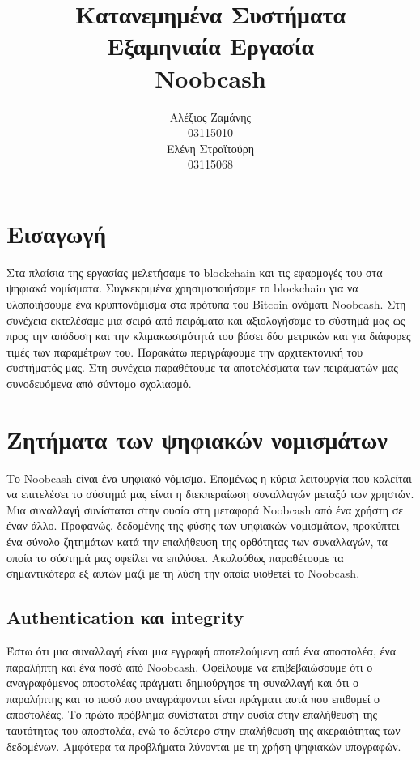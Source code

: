 \documentclass[titlepage]{article}
\begin{document}
\title{Κατανεμημένα Συστήματα\\
    Εξαμηνιαία Εργασία\\
    Noobcash}
\author{Αλέξιος Ζαμάνης\\
    03115010\\
    Ελένη Στραϊτούρη\\
    03115068}

\maketitle

\tableofcontents

\section{Εισαγωγή}

Στα πλαίσια της εργασίας μελετήσαμε το blockchain και τις εφαρμογές του στα ψηφιακά νομίσματα. Συγκεκριμένα χρησιμοποιήσαμε το blockchain για να υλοποιήσουμε ένα κρυπτονόμισμα στα πρότυπα του Bitcoin ονόματι Noobcash. Στη συνέχεια εκτελέσαμε μια σειρά από πειράματα και αξιολογήσαμε το σύστημά μας ως προς την απόδοση και την κλιμακωσιμότητά του βάσει δύο μετρικών και για διάφορες τιμές των παραμέτρων του. Παρακάτω περιγράφουμε την αρχιτεκτονική του συστήματός μας. Στη συνέχεια παραθέτουμε τα αποτελέσματα των πειράματών μας συνοδευόμενα από σύντομο σχολιασμό.

\section{Ζητήματα των ψηφιακών νομισμάτων}

Το Noobcash είναι ένα ψηφιακό νόμισμα. Επομένως η κύρια λειτουργία που καλείται να επιτελέσει το σύστημά μας είναι η διεκπεραίωση συναλλαγών μεταξύ των χρηστών. Μια συναλλαγή συνίσταται στην ουσία στη μεταφορά Noobcash από ένα χρήστη σε έναν άλλο. Προφανώς, δεδομένης της φύσης των ψηφιακών νομισμάτων, προκύπτει ένα σύνολο ζητημάτων κατά την επαλήθευση της ορθότητας των συναλλαγών, τα οποία το σύστημά μας οφείλει να επιλύσει. Ακολούθως παραθέτουμε τα σημαντικότερα εξ αυτών μαζί με τη λύση την οποία υιοθετεί το Noobcash.

\subsection{Authentication και integrity}

Έστω ότι μια συναλλαγή είναι μια εγγραφή αποτελούμενη από ένα αποστολέα, ένα παραλήπτη και ένα ποσό από Noobcash. Οφείλουμε να επιβεβαιώσουμε ότι ο αναγραφόμενος αποστολέας πράγματι δημιούργησε τη συναλλαγή και ότι ο παραλήπτης και το ποσό που αναγράφονται είναι πράγματι αυτά που επιθυμεί ο αποστολέας. Το πρώτο πρόβλημα συνίσταται στην ουσία στην επαλήθευση της ταυτότητας του αποστολέα, ενώ το δεύτερο στην επαλήθευση της ακεραιότητας των δεδομένων. Αμφότερα τα προβλήματα λύνονται με τη χρήση ψηφιακών υπογραφών.
\end{document}
